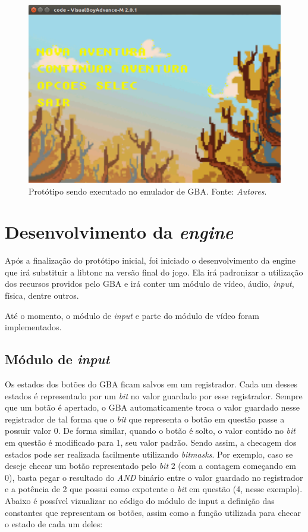 \begin{figure}[H]
 \centering \includegraphics[keepaspectratio=true,scale=0.6]{figuras/tw-gba-1.eps}
   \caption[Protótipo sendo executado no emulador de GBA]
    {Protótipo sendo executado no emulador de GBA. Fonte: \textit{Autores}.}
   \label{tw-gba-1}
\end{figure}

\section{Desenvolvimento da \textit{engine}}

Após a finalização do protótipo inicial, foi iniciado o desenvolvimento da engine que irá substituir a libtonc na versão final do jogo. Ela irá padronizar a utilização dos recursos providos pelo GBA e irá conter um módulo de vídeo, áudio, \textit{input}, física, dentre outros.

Até o momento, o módulo de \textit{input} e parte do módulo de vídeo foram implementados.

\subsection{Módulo de \textit{input}}

Os estados dos botões do GBA ficam salvos em um registrador. Cada um desses estados é representado por um \textit{bit} no valor guardado por esse registrador. Sempre que um botão é apertado, o GBA automaticamente troca o valor guardado nesse registrador de tal forma que o \textit{bit} que representa o botão em questão passe a possuir valor 0. De forma similar, quando o botão é solto, o valor contido no \textit{bit} em questão é modificado para 1, seu valor padrão. Sendo assim, a checagem dos estados pode ser realizada facilmente utilizando \textit{bitmasks}. Por exemplo, caso se deseje checar um botão representado pelo \textit{bit} 2 (com a contagem começando em 0), basta pegar o resultado do \textit{AND} binário entre o valor guardado no registrador e a potência de 2 que possui como expotente o \textit{bit} em questão (4, nesse exemplo). Abaixo é possível vizualizar no código do módulo de input a definição das constantes que representam os botões, assim como a função utilizada para checar o estado de cada um deles:

